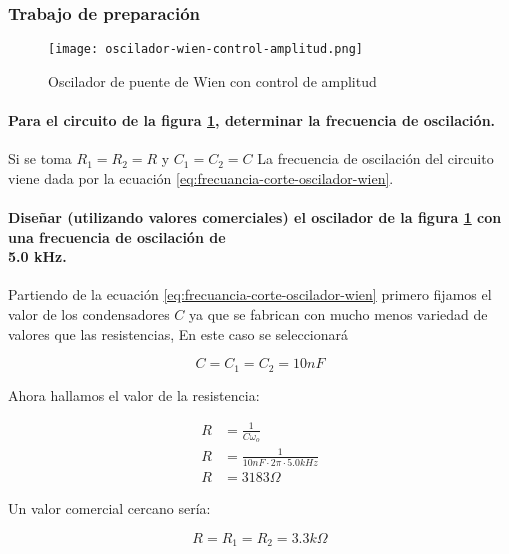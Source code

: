 \subsubsection{Trabajo de preparación}

\begin{figure}[ht]
    \centering
    \texttt{[image: oscilador-wien-control-amplitud.png]}
    \caption{Oscilador de puente de Wien con control de amplitud}
    \label{fig:oscilador-puente-wien-control-de-amplitud}
\end{figure}

\paragraph{Para el circuito de la figura \ref{fig:oscilador-puente-wien-control-de-amplitud}, determinar la frecuencia de oscilación.\\}

Si se toma $R_1 = R_2 = R$ y $C_1 = C_2 = C$ La frecuencia de oscilación del circuito viene dada por la ecuación \ref{eq:frecuancia-corte-oscilador-wien}.

\paragraph{Diseñar (utilizando valores comerciales) el oscilador de la figura \ref{fig:oscilador-puente-wien-control-de-amplitud} con una frecuencia de oscilación de \\5.0 kHz.\\}

Partiendo de la ecuación \ref{eq:frecuancia-corte-oscilador-wien} primero fijamos el valor de los condensadores $C$ ya que se fabrican con mucho menos variedad de valores que las resistencias, En este caso se seleccionará

\begin{equation}
    \boxed{C = C_1 = C_2 = 10nF}
\end{equation}

Ahora hallamos el valor de la resistencia:

\begin{align}
    R &= \frac{1}{C \omega_o} \\
    R &= \frac{1}{10 nF \cdot 2\pi \cdot 5.0 kHz} \\
    R &= 3183\Omega
\end{align}

Un valor comercial cercano sería:

\begin{equation}
    \boxed{R = R_1 = R_2 = 3.3k\Omega}
\end{equation}

